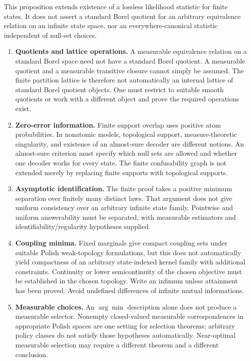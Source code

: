 This proposition extends existence of a lossless likelihood statistic for finite states. It does not assert a standard Borel quotient for an arbitrary equivalence relation on an infinite state space, nor an everywhere-canonical statistic independent of null-set choices.


\begin{enumerate}
\item \textbf{Quotients and lattice operations.} A measurable equivalence relation on a standard Borel space need not have a standard Borel quotient. A measurable quotient and a measurable transitive closure cannot simply be assumed. The finite partition lattice is therefore not automatically an internal lattice of standard Borel quotient objects. One must restrict to suitable smooth quotients or work with a different object and prove the required operations exist.
\item \textbf{Zero-error information.} Finite support overlap uses positive atom probabilities. In nonatomic models, topological support, measure-theoretic singularity, and existence of an almost-sure decoder are different notions. An almost-sure criterion must specify which null sets are allowed and whether one decoder works for every state. The finite confusability graph is not extended merely by replacing finite supports with topological supports.
\item \textbf{Asymptotic identification.} The finite proof takes a positive minimum separation over finitely many distinct laws. That argument does not give uniform consistency over an arbitrary infinite state family. Pointwise and uniform answerability must be separated, with measurable estimators and identifiability/regularity hypotheses supplied.
\item \textbf{Coupling minima.} Fixed marginals give compact coupling sets under suitable Polish weak-topology formulations, but this does not automatically yield compactness of an arbitrary state-indexed kernel family with additional constraints. Continuity or lower semicontinuity of the chosen objective must be established in the chosen topology. Write an infimum unless attainment has been proved. Avoid undefined differences of infinite mutual informations.
\item \textbf{Measurable choices.} An $\arg\min$ description alone does not produce a measurable selector. Nonempty closed-valued measurable correspondences in appropriate Polish spaces are one setting for selection theorems; arbitrary policy classes do not satisfy those hypotheses automatically. Near-optimal measurable selection may require a different theorem and a different conclusion.

\end{enumerate}

